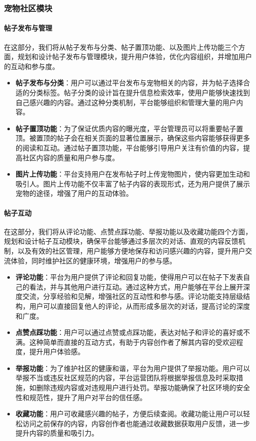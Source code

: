 \subsubsection{宠物社区模块}

\paragraph{帖子发布与管理}

在这部分，我们将从帖子发布与分类、帖子置顶功能、以及图片上传功能三个方面，规划和设计帖子发布与管理模块，提升用户体验，优化内容组织，并增加用户的互动和参与度。

\begin{itemize}
	\item \textbf{帖子发布与分类}：用户可以通过平台发布与宠物相关的内容，并为帖子选择合适的分类标签。帖子分类的设计旨在提升信息检索效率，使用户能够快速找到自己感兴趣的内容。通过这种分类机制，平台能够组织和管理大量的用户内容。
	\item \textbf{帖子置顶功能}：为了保证优质内容的曝光度，平台管理员可以将重要帖子置顶。被置顶的帖子会在相关页面的显著位置展示，确保这些内容能够获得更多的阅读和互动。通过帖子置顶功能，平台能够引导用户关注有价值的内容，提高社区内容的质量和用户参与度。
	\item \textbf{图片上传功能}：平台支持用户在发布帖子时上传宠物图片，使内容更加生动和吸引人。图片上传功能不仅丰富了帖子内容的表现形式，还为用户提供了展示宠物的途径，增强了用户的互动体验。
\end{itemize}

\paragraph{帖子互动}

在这部分，我们将从评论功能、点赞点踩功能、举报功能以及收藏功能四个方面，规划和设计帖子互动模块，确保平台能够通过多层次的对话、直观的内容反馈机制，以及有效的社区管理，用户能够方便地保存和访问感兴趣的内容，提升用户交流体验，同时维护社区的健康环境，增强用户的参与感。

\begin{itemize}
	\item \textbf{评论功能}：平台为用户提供了评论和回复功能，使得用户可以在帖子下发表自己的看法，并与其他用户进行互动。通过这种方式，用户能够在平台上展开深度交流，分享经验和见解，增强社区的互动性和参与感。评论功能支持层级结构，用户可以直接回复他人的评论，从而形成多层次的对话，提高讨论的深度和广度。
	\item \textbf{点赞点踩功能}：用户可以通过点赞或点踩功能，表达对帖子和评论的喜好或不满。这种简单而直接的互动方式，有助于内容创作者了解其内容的受欢迎程度，提升用户体验感。
	\item \textbf{举报功能}：为了维护社区的健康和谐，平台为用户提供了举报功能。用户可以举报不当或违反社区规范的内容，平台运营团队将根据举报信息及时采取措施，如删除违规内容或对违规用户进行处罚。举报功能确保了社区环境的安全性和规范性，提升了用户对平台的信任感。
	\item \textbf{收藏功能}：用户可收藏感兴趣的帖子，方便后续查阅。收藏功能让用户可以轻松访问之前保存的内容，内容创作者也能通过收藏数据获取用户反馈，进一步提升内容的质量和吸引力。
\end{itemize}

